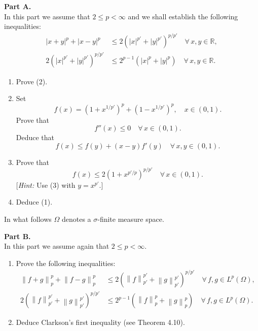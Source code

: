 \documentclass[12pt]{article}
\newcommand{\norm}[1]{\left\|#1\right\|}
\newcommand{\abs}[1]{\left|#1\right|}
\newcommand{\R}{\mathbb{R}}
\begin{document}
\medskip
 
\noindent\textbf{Part A.}\\
In this part we assume that $2 \le p < \infty$ and we shall establish the following inequalities:
\begin{align}
\abs{x+y}^p + \abs{x-y}^p &\le 2(\abs{x}^{p'} + \abs{y}^{p'})^{p/p'} \quad \forall\, x, y \in \R, \tag{1}\\
2(\abs{x}^{p'} + \abs{y}^{p'})^{p/p'} &\le 2^{p-1}(\abs{x}^p + \abs{y}^p) \quad \forall\, x, y \in \R. \tag{2}
\end{align}
 
\begin{enumerate}
\item Prove (2).
 
\noindent[\textit{Hint:} Use the convexity of the function $g(t) = \abs{t}^{p/p'}$.]
 
\item Set
\[
f(x) = (1 + x^{1/p'})^p + (1 - x^{1/p'})^p, \quad x \in (0,1).
\]
Prove that
\[
f''(x) \le 0 \quad \forall\, x \in (0,1).
\]
Deduce that
\begin{equation}\tag{3}
f(x) \le f(y) + (x-y)f'(y) \quad \forall\, x, y \in (0,1).
\end{equation}
 
\item Prove that
\[
f(x) \le 2(1 + x^{p'/p})^{p/p'} \quad \forall\, x \in (0,1).
\]
[\textit{Hint:} Use (3) with $y = x^{p'}$.]
 
\item Deduce (1).
\end{enumerate}
 
\noindent In what follows $\Omega$ denotes a $\sigma$-finite measure space.
 
\medskip
 
\noindent\textbf{Part B.}\\
In this part we assume again that $2 \le p < \infty$.
 
\begin{enumerate}
\item Prove the following inequalities:
\begin{align}
\norm{f+g}_p^p + \norm{f-g}_p^p &\le 2(\norm{f}_{p'}^{p'} + \norm{g}_{p'}^{p'})^{p/p'} \quad \forall\, f, g \in L^p(\Omega), \tag{4}\\
2(\norm{f}_{p'}^{p'} + \norm{g}_{p'}^{p'})^{p/p'} &\le 2^{p-1}(\norm{f}_p^p + \norm{g}_p^p) \quad \forall\, f, g \in L^p(\Omega). \tag{5}
\end{align}
 
\item Deduce Clarkson's first inequality (see Theorem 4.10).
\end{enumerate}
 
\end{document}
